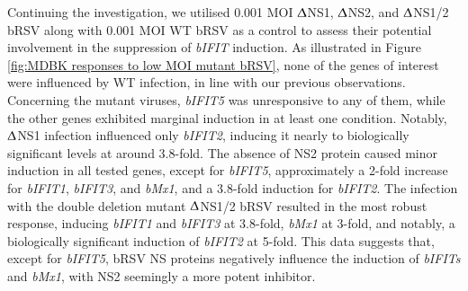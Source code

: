 Continuing the investigation, we utilised 0.001 MOI $\Updelta$NS1, $\Updelta$NS2, and $\Updelta$NS1/2 bRSV along with 0.001 MOI WT bRSV as a control to assess their potential involvement in the suppression of \textit{bIFIT} induction. As illustrated in Figure \ref{fig:MDBK responses to low MOI mutant bRSV}, none of the genes of interest were influenced by WT infection, in line with our previous observations. Concerning the mutant viruses, \textit{bIFIT5} was unresponsive to any of them, while the other genes exhibited marginal induction in at least one condition. Notably, $\Updelta$NS1 infection influenced only \textit{bIFIT2}, inducing it nearly to biologically significant levels at around 3.8-fold. The absence of NS2 protein caused minor induction in all tested genes, except for \textit{bIFIT5}, approximately a 2-fold increase for \textit{bIFIT1}, \textit{bIFIT3}, and \textit{bMx1}, and a 3.8-fold induction for \textit{bIFIT2}. The infection with the double deletion mutant $\Updelta$NS1/2 bRSV resulted in the most robust response, inducing \textit{bIFIT1} and \textit{bIFIT3} at 3.8-fold, \textit{bMx1} at 3-fold, and notably, a biologically significant induction of \textit{bIFIT2} at 5-fold. This data suggests that, except for \textit{bIFIT5}, bRSV NS proteins negatively influence the induction of \textit{bIFITs} and \textit{bMx1}, with NS2 seemingly a more potent inhibitor.

